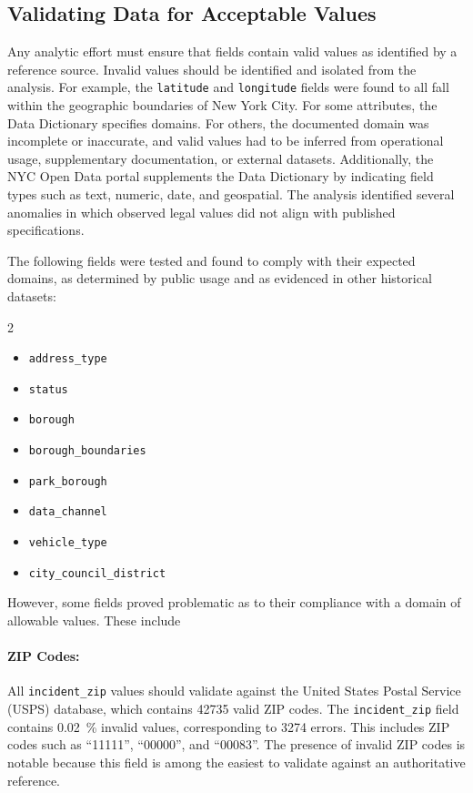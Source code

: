 \documentclass[linenumber]{jdsart}
\begin{document}

\subsection{Validating Data for Acceptable Values}
\label{sec:domain}
Any analytic effort must ensure that fields contain valid values
as identified by a reference source. Invalid values should 
be identified and isolated from the analysis. For example, the \texttt{latitude} 
and \texttt{longitude} fields were found to all fall within the 
geographic boundaries of New York City. For some attributes, 
the Data Dictionary specifies domains. For others, the documented 
domain was incomplete or inaccurate, and valid values had 
to be inferred from operational usage, supplementary
documentation, or external datasets. Additionally, the NYC Open Data 
portal supplements the Data Dictionary by indicating 
field types such as text, numeric, date, and geospatial.
The analysis identified several anomalies in which
observed legal values did not align with published specifications.


The following fields were tested and found to comply with their expected
domains, as determined by public usage and as evidenced in 
other historical datasets:

\begin{multicols}{2}
\begin{itemize}[left=1.5em, itemsep=0.1\baselineskip]
  \item \texttt{address\_type}
  \item \texttt{status}
  \item \texttt{borough}
  \item \texttt{borough\_boundaries}
  \item \texttt{park\_borough}
  \item \texttt{data\_channel}
  \item \texttt{vehicle\_type}
  \item \texttt{city\_council\_district}
\end{itemize}
\end{multicols}


However, some fields proved problematic as to their 
compliance with a domain of allowable values. These include

\paragraph{ZIP Codes:}
\label{sec:zipcodesissues}
All \texttt{incident\_zip} values should validate against the
United States Postal Service (USPS) database, which contains
\num{42735} valid ZIP codes. The \texttt{incident\_zip} field
contains \SI[round-mode=places, round-precision=2]{0.02}{\percent}
invalid values, corresponding to \num{3274} errors.
 This includes ZIP codes such as ``11111'', ``00000'', and ``00083''. The presence of 
invalid ZIP codes is notable because this field is
among the easiest to validate against an authoritative reference.
\end{document}
